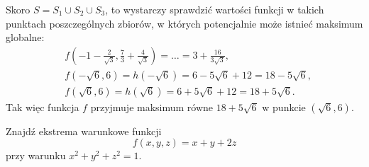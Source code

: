 \begin{solution}
    Skoro $S = S_1 \cup S_2 \cup S_3$, to wystarczy sprawdzić wartości funkcji w takich punktach poszczególnych zbiorów, w których potencjalnie może istnieć maksimum globalne:
    \begin{align*}
        & f\left(-1-\tfrac{2}{\sqrt{3}}, \tfrac{7}{3} + \tfrac{4}{\sqrt{3}}\right) = \ldots = 3 + \tfrac{16}{3\sqrt{3}}, \\
        & f(-\sqrt{6}, 6) = h(-\sqrt{6}) = 6 - 5\sqrt{6} + 12 = 18 - 5\sqrt{6}, \\
        & f(\sqrt{6}, 6) = h(\sqrt{6}) = 6 + 5\sqrt{6} + 12 = 18 + 5\sqrt{6}.
    \end{align*}
    Tak więc funkcja $f$ przyjmuje maksimum równe $18 + 5\sqrt{6}$ w punkcie $\left(\sqrt{6}, 6\right)$.
\end{solution}

\begin{example}
    Znajdź ekstrema warunkowe funkcji
    \[ f(x, y, z) = x + y + 2z \]
    przy warunku $x^2 + y^2 + z^2 = 1$.
\end{example}
